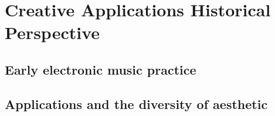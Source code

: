 
\chapter{Creative Applications Historical Perspective}
\label{history}

\section{Early electronic music practice}
\section{Applications and the diversity of aesthetic}




